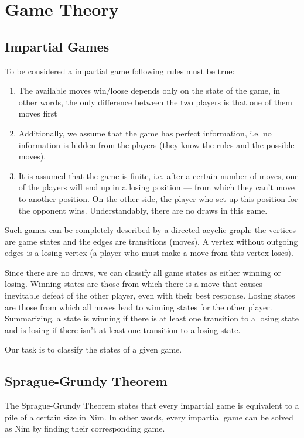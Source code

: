 \section{Game Theory}

\subsection{Impartial Games}

To be considered a impartial game following rules must be true: 

\begin{enumerate}
    \item The available moves win/loose depends only on the state of the game, in other words, the only difference between the two players is that one of them moves first
    \item Additionally, we assume that the game has perfect information, i.e. no information is hidden from the players (they know the rules and the possible moves).
    \item It is assumed that the game is finite, i.e. after a certain number of moves, one of the players will end up in a losing position — from which they can't move to another position. On the other side, the player who set up this position for the opponent wins. Understandably, there are no draws in this game.
\end{enumerate}

Such games can be completely described by a directed acyclic graph: the vertices are game states and the edges are transitions (moves). A vertex without outgoing edges is a losing vertex (a player who must make a move from this vertex loses).

Since there are no draws, we can classify all game states as either winning or losing. Winning states are those from which there is a move that causes inevitable defeat of the other player, even with their best response. Losing states are those from which all moves lead to winning states for the other player. Summarizing, a state is winning if there is at least one transition to a losing state and is losing if there isn't at least one transition to a losing state.

Our task is to classify the states of a given game.


\subsection{Sprague-Grundy Theorem}
The Sprague-Grundy Theorem states that every impartial game is equivalent to a pile of a certain size in Nim. In other words, every impartial game can be solved as Nim by finding their corresponding game.

